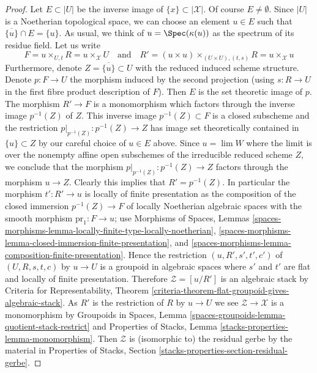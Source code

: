 \begin{proof}
\medskip\noindent
Let $E \subset |U|$ be the inverse image of $\{x\} \subset |\mathcal{X}|$.
Of course $E \not = \emptyset$.
Since $|U|$ is a Noetherian topological space, we can choose an element
$u \in E$ such that $\overline{\{u\}} \cap E = \{u\}$.
As usual, we think of $u = \Spec(\kappa(u))$ as the spectrum of
its residue field. Let us write
$$
F = u \times_{U, t} R = u \times_\mathcal{X} U
\quad\text{and}\quad
R' = (u \times u) \times_{(U \times U), (t, s)} R = u \times_\mathcal{X} u
$$
Furthermore, denote $Z = \overline{\{u\}} \subset U$ with the reduced
induced scheme structure. Denote $p : F \to U$ the morphism induced
by the second projection (using $s : R \to U$ in the first fibre product
description of $F$). Then $E$ is the set theoretic image of $p$.
The morphism $R' \to F$ is a monomorphism which factors through the
inverse image $p^{-1}(Z)$ of $Z$. This inverse image
$p^{-1}(Z) \subset F$ is a closed subscheme and
the restriction $p|_{p^{-1}(Z)} : p^{-1}(Z) \to Z$ has image
set theoretically contained in $\{u\} \subset Z$ by our careful
choice of $u \in E$ above. Since $u = \lim W$ where the limit
is over the nonempty affine open subschemes of the irreducible reduced scheme
$Z$, we conclude that the morphism $p|_{p^{-1}(Z)} : p^{-1}(Z) \to Z$
factors through the morphism $u \to Z$. Clearly this implies that
$R' = p^{-1}(Z)$. In particular the morphism $t' : R' \to u$ is
locally of finite presentation as the composition of the closed
immersion $p^{-1}(Z) \to F$ of locally Noetherian algebraic spaces
with the smooth morphism $\text{pr}_1 : F \to u$; use
Morphisms of Spaces, Lemmas
\ref{spaces-morphisms-lemma-locally-finite-type-locally-noetherian},
\ref{spaces-morphisms-lemma-closed-immersion-finite-presentation}, and
\ref{spaces-morphisms-lemma-composition-finite-presentation}.
Hence the restriction $(u, R', s', t', c')$ of $(U, R, s, t, c)$
by $u \to U$ is a groupoid in algebraic spaces where $s'$ and $t'$
are flat and locally of finite presentation. Therefore
$\mathcal{Z} = [u/R']$ is an algebraic stack by
Criteria for Representability, Theorem
\ref{criteria-theorem-flat-groupoid-gives-algebraic-stack}.
As $R'$ is the restriction of $R$ by $u \to U$ we see
$\mathcal{Z} \to \mathcal{X}$ is a monomorphism by
Groupoids in Spaces, Lemma
\ref{spaces-groupoids-lemma-quotient-stack-restrict}
and
Properties of Stacks, Lemma \ref{stacks-properties-lemma-monomorphism}.
Then $\mathcal{Z}$ is (isomorphic to) the residual gerbe by
the material in Properties of Stacks, Section
\ref{stacks-properties-section-residual-gerbe}.
\end{proof}













